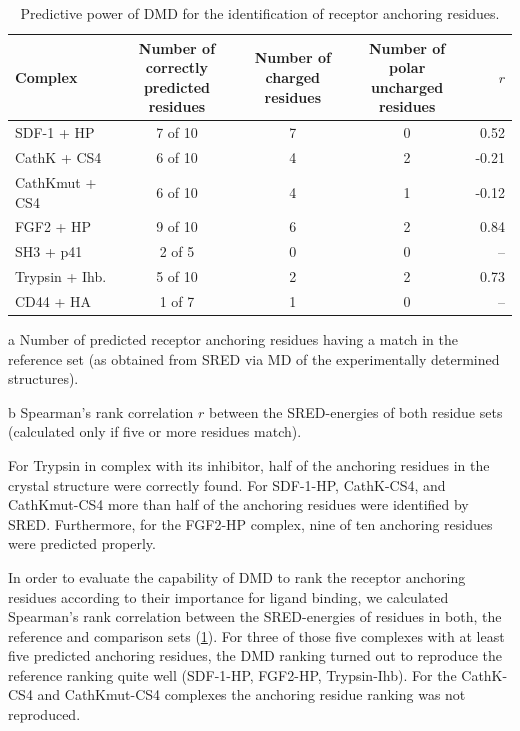 \begin{table}
\tiny
  \centering
  \smallskip
  \begin{threeparttable}
    {\renewcommand{\arraystretch}{1.3}%
      \begin{tabular}{lcccr}
      \hline
      \textbf{Complex} & \specialcell{\textbf{Number of correctly} \\ \textbf{predicted residues}\tnote{a}} &
      \specialcell{\textbf{Number of} \\ \textbf{charged residues}} &
      \specialcell{\textbf{Number of polar} \\ \textbf{uncharged residues}} & $r$\tnote{b} \\ \hline
      SDF-1 + HP & 7 of 10 & 7 & 0 & 0.52 \\
      CathK + CS4 & 6 of 10 & 4 & 2 & -0.21 \\
      CathKmut + CS4 & 6 of 10 & 4 & 1 & -0.12 \\
      FGF2 + HP & 9 of 10 & 6 & 2 & 0.84 \\
      SH3 + p41 & 2 of 5 & 0 & 0 & -- \\
      Trypsin + Ihb. & 5 of 10 & 2 & 2 & 0.73 \\
      CD44 + HA & 1 of 7 & 1 & 0 & -- \\ \hline
      \end{tabular}
    }
    \begin{tablenotes}
      \item[a] Number of predicted receptor anchoring residues having a match in
      the reference set (as obtained from SRED via MD of the experimentally determined structures).
      \item[b] Spearman's rank correlation $r$ between the SRED-energies of both residue sets
      (calculated only if five or more residues match).
    \end{tablenotes}
  \end{threeparttable}
\caption{Predictive power of DMD for the identification of receptor anchoring residues.}
\label{tab:dmd:anchoring_receptor_redidues}
\end{table}


For Trypsin in complex with its inhibitor, half of the anchoring residues in the
crystal structure were correctly found. For SDF-1-HP, CathK-CS4, and
CathKmut-CS4 more than half of the anchoring residues were identified by SRED.
Furthermore, for the FGF2-HP complex, nine of ten anchoring residues were
predicted properly.

In order to evaluate the capability of DMD to rank the receptor anchoring
residues according to their importance for ligand binding, we calculated
Spearman's rank correlation between the SRED-energies of residues in both, the
reference and comparison sets (\cref{tab:dmd:anchoring_receptor_redidues}). For
three of those five complexes with at least five predicted anchoring residues,
the DMD ranking turned out to reproduce the reference ranking quite well
(SDF-1-HP, FGF2-HP, Trypsin-Ihb). For the CathK-CS4 and CathKmut-CS4 complexes
the anchoring residue ranking was not reproduced.

